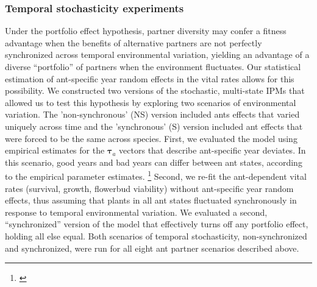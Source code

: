 \documentclass[11pt]{article}
\newcommand{\tom}[2]{{\color{red}{#1}}\footnote{\textit{\color{red}{#2}}}}
\begin{document}

\subsubsection*{Temporal stochasticity experiments}
Under the portfolio effect hypothesis, partner diversity may confer a fitness advantage when the benefits of alternative partners are not perfectly synchronized across temporal environmental variation, yielding an advantage of a diverse ``portfolio'' of partners when the environment fluctuates. 
Our statistical estimation of ant-specific year random effects in the vital rates allows for this possibility. 
We constructed two versions of the stochastic, multi-state IPMs that allowed us to test this hypothesis by exploring two scenarios of environmental variation.
The 'non-synchronous' (NS) version included ants effects that varied uniquely across time and the 'synchronous' (S) version included  ant effects that were forced to be the same across species. 
First, we evaluated the model using empirical estimates for the $\pmb{\tau}_{a}$ vectors that describe ant-specific year deviates. 
In this scenario, good years and bad years can differ between ant states, according to the empirical parameter estimates. 
\tom{We also quantified from the fitted random effects how tightly inter-annual variation was correlated between ant states.}{Worth doing!} 
Second, we re-fit the ant-dependent vital rates (survival, growth, flowerbud viability) without ant-specific year random effects, thus assuming that plants in all ant states fluctuated synchronously in response to temporal environmental variation. 
We evaluated a second, ``synchronized'' version of the model that effectively turns off any portfolio effect, holding all else equal. 
Both scenarios of temporal stochasticity, non-synchronized and synchronized, were run for all eight ant partner scenarios described above. 
\end{document}
